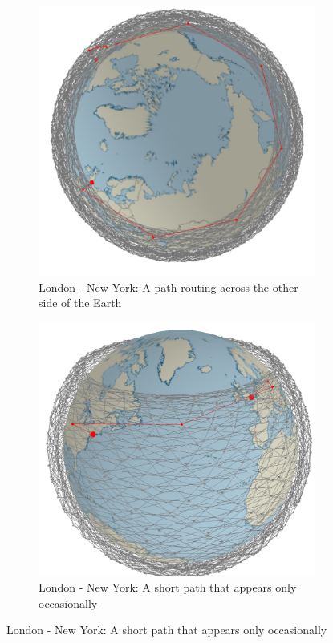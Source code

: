 \documentclass[12pt]{report}
\begin{document}
\begin{figure}
	\centering
	\caption{Screenshots of DistL creating extremely long links between locations}
	\label{fig:Screenshots of DistL}
	\begin{subfigure}[b]{0.4\textwidth}
		\caption{London - New York: A path routing across the other side of the Earth}
		\includegraphics[width=\textwidth]{LDN-NY-DISTL-1}
	\end{subfigure}
	\hfill
	\begin{subfigure}[b]{0.4\textwidth}
		\caption{London - New York: A short path that appears only occasionally}
		\includegraphics[width=\textwidth]{LDN-NY-DISTL-2}
	\end{subfigure}
	

\end{figure}
\end{document}
